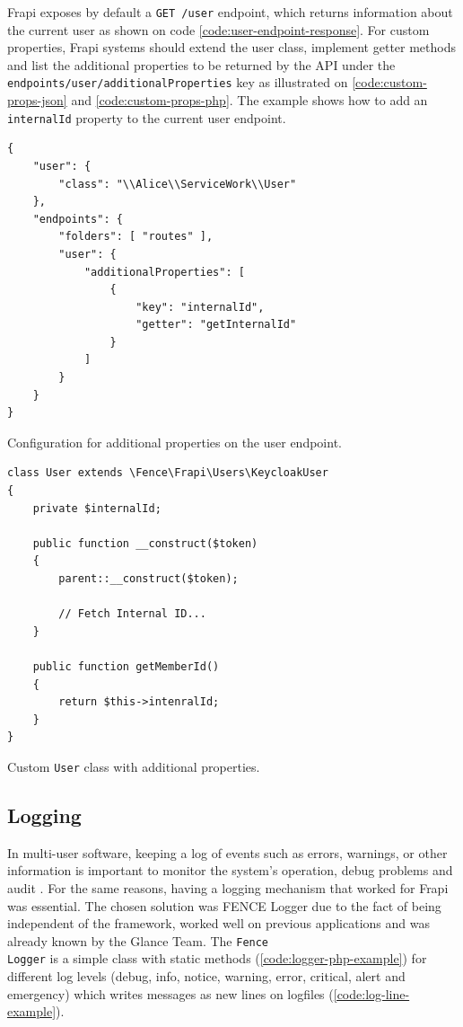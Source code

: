Frapi exposes by default a \texttt{GET /user} endpoint, which returns information about the current user as shown on code \autoref{code:user-endpoint-response}. For custom properties, Frapi systems should extend the user class, implement getter methods and list the additional properties to be returned by the API under the \texttt{endpoints/user/additionalProperties} key as illustrated on \autoref{code:custom-props-json} and \autoref{code:custom-props-php}. The example shows how to add an \texttt{internalId} property to the current user endpoint.

\begin{listing}[htbp]
\begin{verbatim}
{
    "user": {
        "class": "\\Alice\\ServiceWork\\User"
    },
    "endpoints": {
        "folders": [ "routes" ],
        "user": {
            "additionalProperties": [
                {
                    "key": "internalId",
                    "getter": "getInternalId"
                }
            ]
        }
    }
}
\end{verbatim}
\caption{Configuration for additional properties on the user endpoint.}
\label{code:custom-props-json}
\end{listing}

\begin{listing}[htbp]
\begin{verbatim}
class User extends \Fence\Frapi\Users\KeycloakUser
{
	private $internalId;

	public function __construct($token)
	{
		parent::__construct($token);
		
		// Fetch Internal ID...
	}

    public function getMemberId()
    {
        return $this->intenralId;
    }
}
\end{verbatim}
\caption{Custom \texttt{User} class with additional properties.}
\label{code:custom-props-php}
\end{listing}

\subsection{Logging}

In multi-user software, keeping a log of events such as errors, warnings, or other information is important to monitor the system's operation, debug problems and audit \cite{logging-wikipedia}. For the same reasons, having a logging mechanism that worked for Frapi was essential. The chosen solution was FENCE Logger due to the fact of being independent of the framework, worked well on previous applications and was already known by the Glance Team. The \texttt{Fence\\Logger} is a simple class with static methods (\autoref{code:logger-php-example}) for different log levels (debug, info, notice, warning, error, critical, alert and emergency) which writes messages as new lines on logfiles (\autoref{code:log-line-example}).

